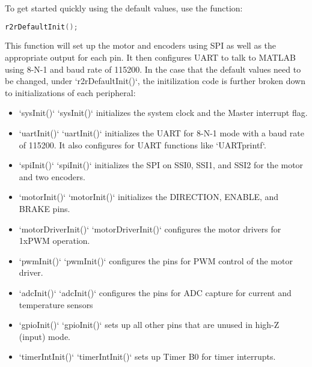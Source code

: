 \documentclass[letterpaper,12pt]{nuthesis}	%
\begin{document}



To get started quickly using the default values, use the function:

\begin{lstlisting}[language=C]
r2rDefaultInit();
\end{lstlisting}

This function will set up the motor and encoders using SPI as well as the appropriate output for each pin. It then configures UART to talk to MATLAB using 8-N-1 and baud rate of 115200. In the case that the default values need to be changed, under `r2rDefaultInit()`, the initilization code is further broken down to initializations of each peripheral:

\begin{itemize}
	\item `sysInit()`
	`sysInit()` initializes the system clock and the Master interrupt flag.

	\item `uartInit()`
	`uartInit()` initializes the UART for 8-N-1 mode with a baud rate of 115200. It also configures for UART functions like `UARTprintf`.

	\item `spiInit()`
	`spiInit()` initializes the SPI on SSI0, SSI1, and SSI2 for the motor and two encoders.

	\item `motorInit()`
	`motorInit()` initializes the DIRECTION, ENABLE, and BRAKE pins.

	\item `motorDriverInit()`
	`motorDriverInit()` configures the motor drivers for 1xPWM operation.

	\item `pwmInit()`
	`pwmInit()` configures the pins for PWM control of the motor driver.

	\item `adcInit()`
	`adcInit()` configures the pins for ADC capture for current and temperature sensors

	\item `gpioInit()`
	`gpioInit()` sets up all other pins that are unused in high-Z (input) mode.

	\item `timerIntInit()`
	`timerIntInit()` sets up Timer B0 for timer interrupts.
\end{itemize}
\end{document}
